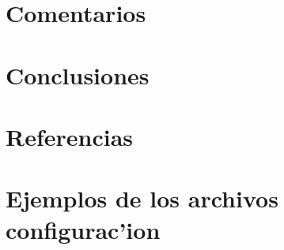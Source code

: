 \documentclass[spanish, a4paper, 10pt, titlepage]{article}
\begin{document}
\section{Comentarios}

\clearpage

\section{Conclusiones}

\clearpage

\section{Referencias}

\clearpage


\appendix
\section{Ejemplos de los archivos configurac'ion}

\clearpage



\end{document}
